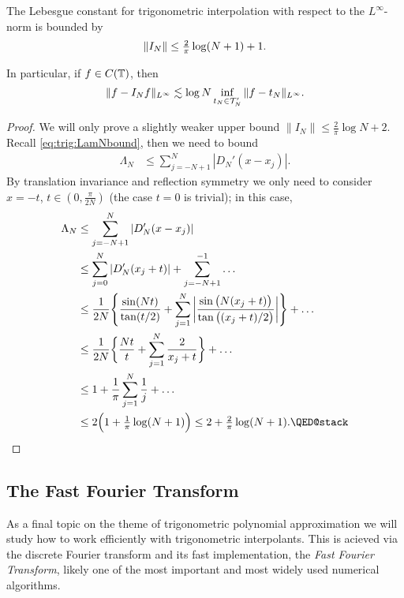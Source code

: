 \begin{theorem} \label{th:trig:lebesgue}
  The Lebesgue constant for trigonometric interpolation with respect to the
  $L^\infty$-norm is bounded by
  \[
    \|I_N\| \leq {\textstyle \frac{2}{\pi}} \log (N+1) + 1. 
  \]

  In particular, if $f \in C(\mathbb{T})$, then
  \[
      \| f - I_N f \|_{L^\infty}
        \lesssim \log N \inf_{t_N \in \mathcal{T}_N'} \| f - t_N \|_{L^\infty}.
  \]
\end{theorem}
\begin{proof}
  We will only prove a slightly weaker upper bound $\|I_N\| \leq \frac{2}{\pi} \log N + 2$. Recall
\eqref{eq:trig:LamNbound}, then we need to bound
  \begin{align*}
    \Lambda_N
    &\leq
    \sum_{j =  -N+1}^N |D_N'(x - x_j)|.
  \end{align*}
  By translation invariance and reflection symmetry we only need to consider $x
  = -t$, $t \in (0, \frac{\pi}{2N})$ (the case $t = 0$ is trivial); in this
  case,
  \begin{align*}
    \Lambda_N
    &\leq
    \sum_{j =  -N+1}^N |D_N'(x - x_j)| \\
    &\leq
    \sum_{j =  0}^N |D_N'(x_j+t)|  + \sum_{j = -N+1}^{-1} \dots \\
    &\leq
    \frac{1}{2N} \Bg\{
        \frac{\sin(Nt)}{\tan(t/2)}
        + \sum_{j = 1}^N
        \bg|\frac{\sin\b(N(x_j+t)\b)}{\tan\b((x_j+t)/2\b)}\bg|
      \Bg\} + \dots \\
    &\leq
    \frac{1}{2N} \bg\{
        \frac{Nt}{t} + \sum_{j = 1}^N \frac{2}{ x_j+t }
    \bg\} + \dots \\
    &\leq 
    1 + \frac{1}{\pi} \sum_{j = 1}^N \frac{1}{j} + \dots \\ 
    &\leq 
    2\Big( 1 + \smfrac{1}{\pi} \log(N+1) \Big) 
    \leq 2 + \smfrac{2}{\pi} \log(N+1).
    \qedhere
  \end{align*}
\end{proof}


\subsection{The Fast Fourier Transform}
%
\label{sec:trig:fft}
%
As a final topic on the theme of trigonometric polynomial approximation we will
study how to work efficiently with trigonometric interpolants. This is acieved
via the discrete Fourier transform and its fast implementation, the {\it Fast
Fourier Transform}, likely one of the most important and most widely used
numerical algorithms.

